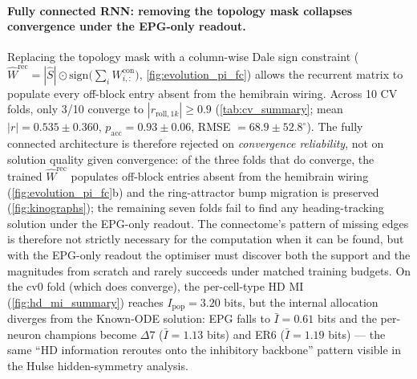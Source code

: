 \documentclass[11pt]{article}
\begin{document}
\paragraph{Fully connected RNN: removing the topology mask collapses convergence under the EPG-only readout.}
Replacing the topology mask with a column-wise Dale sign constraint
($\hat W^{\mathrm{rec}} = |\hat S| \odot
\mathrm{sign}\big(\sum_i W^{\mathrm{con}}_{i,:}\big)$,
\cref{fig:evolution_pi_fc}) allows the recurrent matrix to populate
every off-block entry absent from the hemibrain wiring. Across 10
CV folds, only 3/10 converge to $|r_{\mathrm{roll},1k}| \ge 0.9$
(\cref{tab:cv_summary}; mean $|r| = 0.535 \pm 0.360$,
$p_{\mathrm{acc}} = 0.93 \pm 0.06$, RMSE $= 68.9 \pm 52.8^\circ$).
The fully connected architecture is therefore rejected on
\emph{convergence reliability}, not on solution quality given
convergence: of the three folds that do converge, the trained
$\hat W^{\mathrm{rec}}$ populates off-block entries absent from
the hemibrain wiring (\cref{fig:evolution_pi_fc}b) and the
ring-attractor bump migration is preserved
(\cref{fig:kinographs}); the remaining seven folds fail to find
any heading-tracking solution under the EPG-only readout. The
connectome's pattern of missing edges is therefore not strictly
necessary for the computation when it can be found, but with the
EPG-only readout the optimiser must discover both the support and
the magnitudes from scratch and rarely succeeds under matched
training budgets. On the cv0 fold (which does converge), the
per-cell-type HD MI (\cref{fig:hd_mi_summary}) reaches
$I_{\mathrm{pop}} = 3.20$ bits, but the internal allocation
diverges from the Known-ODE solution: EPG falls to $\bar I = 0.61$
bits and the per-neuron champions become $\Delta 7$ ($\bar I =
1.13$ bits) and ER6 ($\bar I = 1.19$ bits) --- the same
``HD information reroutes onto the inhibitory backbone'' pattern
visible in the Hulse hidden-symmetry analysis.
\end{document}
